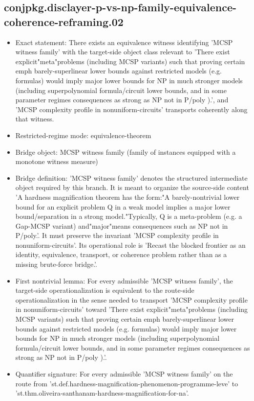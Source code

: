 \documentclass[11pt]{article}
\begin{document}
\subsection*{conjpkg.disclayer-p-vs-np-family-equivalence-coherence-reframing.02}
\begin{itemize}
\item Exact statement: There exists an equivalence witness identifying 'MCSP witness family' with the target-side object class relevant to 'There exist explicit"meta"problems (including MCSP variants) such that proving certain emph barely-superlinear lower bounds against restricted models (e.g. formulas) would imply major lower bounds for NP in much stronger models (including superpolynomial formula/circuit lower bounds, and in some parameter regimes consequences as strong as NP not in P/poly ).', and 'MCSP complexity profile in nonuniform-circuits' transports coherently along that witness.
\item Restricted-regime mode: equivalence-theorem
\item Bridge object: MCSP witness family (family of instances equipped with a monotone witness measure)
\item Bridge definition: 'MCSP witness family' denotes the structured intermediate object required by this branch. It is meant to organize the source-side content 'A hardness magnification theorem has the form:"A barely-nontrivial lower bound for an explicit problem Q in a weak model implies a major lower bound/separation in a strong model."Typically, Q is a meta-problem (e.g. a Gap-MCSP variant) and"major"means consequences such as NP not in P/poly.'. It must preserve the invariant 'MCSP complexity profile in nonuniform-circuits'. Its operational role is 'Recast the blocked frontier as an identity, equivalence, transport, or coherence problem rather than as a missing brute-force bridge.'.
\item First nontrivial lemma: For every admissible 'MCSP witness family', the target-side operationalization is equivalent to the route-side operationalization in the sense needed to transport 'MCSP complexity profile in nonuniform-circuits' toward 'There exist explicit"meta"problems (including MCSP variants) such that proving certain emph barely-superlinear lower bounds against restricted models (e.g. formulas) would imply major lower bounds for NP in much stronger models (including superpolynomial formula/circuit lower bounds, and in some parameter regimes consequences as strong as NP not in P/poly ).'.
\item Quantifier signature: For every admissible 'MCSP witness family' on the route from 'st.def.hardness-magnification-phenomenon-programme-leve' to 'st.thm.oliveira-santhanam-hardness-magnification-for-na'.

\end{itemize}
\end{document}
